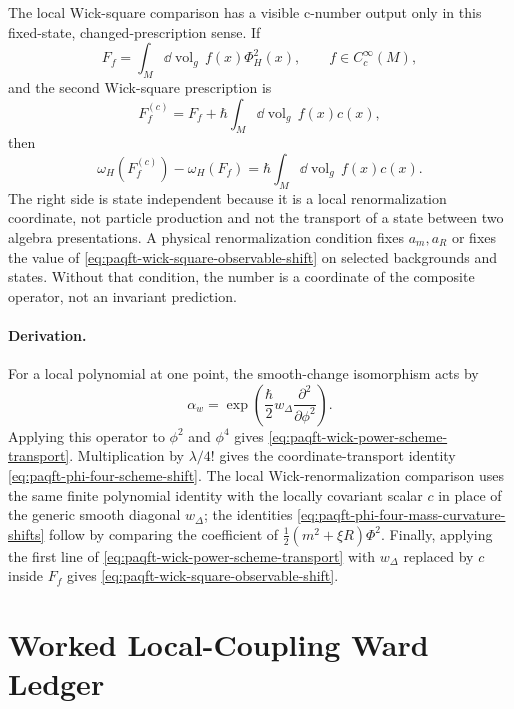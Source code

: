 The local Wick-square comparison has a visible c-number output only in this
fixed-state, changed-prescription sense.  If
\[
  F_f=\int_M\dd\operatorname{vol}_g\, f(x)\Phi_H^2(x),
  \qquad f\in C_c^\infty(M),
\]
and the second Wick-square prescription is
\[
  F_f^{(c)}
  =
  F_f+\hbar\int_M\dd\operatorname{vol}_g\,f(x)c(x),
\]
then
\begin{equation}
  \omega_H\!\left(F_f^{(c)}\right)-\omega_H(F_f)
  =
  \hbar\int_M\dd\operatorname{vol}_g\,f(x)c(x).
  \label{eq:paqft-wick-square-observable-shift}
\end{equation}
The right side is state independent because it is a local renormalization
coordinate, not particle production and not the transport of a state between
two algebra presentations.  A physical renormalization condition fixes
\(a_m,a_R\) or fixes the value of
\eqref{eq:paqft-wick-square-observable-shift} on selected backgrounds and
states.  Without that condition, the number is a coordinate of the composite
operator, not an invariant prediction.

\paragraph{Derivation.}
For a local polynomial at one point, the smooth-change isomorphism acts by
\[
  \alpha_w
  =
  \exp\left(\frac{\hbar}{2}w_\Delta
  \frac{\partial^2}{\partial\phi^2}\right).
\]
Applying this operator to \(\phi^2\) and \(\phi^4\) gives
\eqref{eq:paqft-wick-power-scheme-transport}.  Multiplication by
\(\lambda/4!\) gives the coordinate-transport identity
\eqref{eq:paqft-phi-four-scheme-shift}.  The local Wick-renormalization
comparison uses the same finite polynomial identity with the locally
covariant scalar \(c\) in place of the generic smooth diagonal
\(w_\Delta\); the identities
\eqref{eq:paqft-phi-four-mass-curvature-shifts} follow by comparing the
coefficient of \(\frac12(m^2+\xi R)\Phi^2\).  Finally, applying the first
line of \eqref{eq:paqft-wick-power-scheme-transport} with
\(w_\Delta\) replaced by \(c\) inside \(F_f\) gives
\eqref{eq:paqft-wick-square-observable-shift}.

\section{Worked Local-Coupling Ward Ledger}
\label{sec:paqft-local-coupling-ward-ledger}

